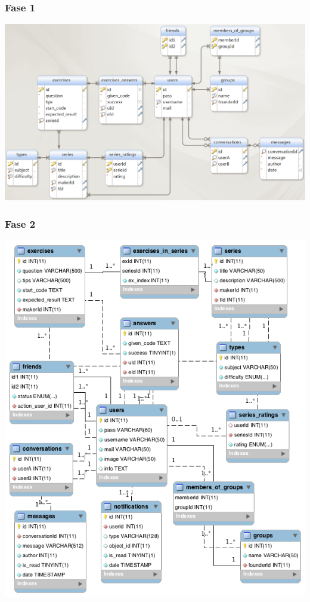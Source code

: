 \subsubsection{Fase 1}
\mbox{\hspace{-6ex}\includegraphics[keepaspectratio=true, scale=0.4]{raport_files/design/UML1.png}}
\subsubsection{Fase 2}
\mbox{\hspace{-6ex}\includegraphics[keepaspectratio=true, scale=0.6]{raport_files/design/UML2.png}}\\
